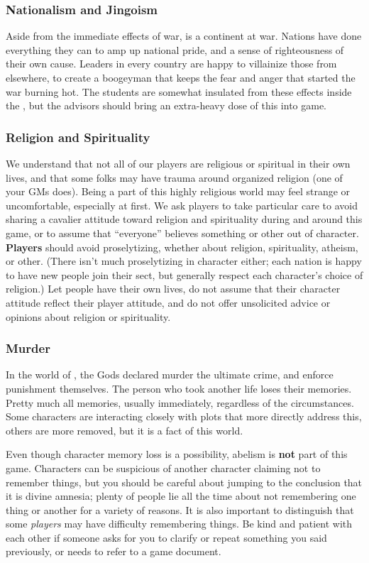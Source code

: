 \documentclass[sheet]{GL2020}
\begin{document}
\subsubsection{Nationalism and Jingoism}
Aside from the immediate effects of war, \pEarth{} is a continent at war. Nations have done everything they can to amp up national pride, and a sense of righteousness of their own cause. Leaders in every country are happy to villainize those from elsewhere, to create a boogeyman that keeps the fear and anger that started the war burning hot. The students are somewhat insulated from these effects inside the \pSchool{}, but the advisors should bring an extra-heavy dose of this into game.

\subsubsection{Religion and Spirituality}
We understand that not all of our players are religious or spiritual in their own lives, and that some folks may have trauma around organized religion (one of your GMs does). Being a part of this highly religious world may feel strange or uncomfortable, especially at first. We ask players to take particular care to avoid sharing a cavalier attitude toward religion and spirituality during and around this game, or to assume that ``everyone'' believes something or other out of character. \textbf{Players} should avoid proselytizing, whether about religion, spirituality, atheism, or other. (There isn't much proselytizing in character either; each nation is happy to have new people join their sect, but generally respect each character's choice of religion.) Let people have their own lives, do not assume that their character attitude reflect their player attitude, and do not offer unsolicited advice or opinions about religion or spirituality.

\subsubsection{Murder}
In the world of \pEarth{}, the Gods declared murder the ultimate crime, and enforce punishment themselves. The person who took another life loses their memories. Pretty much all memories, usually immediately, regardless of the circumstances. Some characters are interacting closely with plots that more directly address this, others are more removed, but it is a fact of this world. 

Even though character memory loss is a possibility, abelism is \textbf{not} part of this game. Characters can be suspicious of another character claiming not to remember things, but you should be careful about jumping to the conclusion that it is divine amnesia; plenty of people lie all the time about not remembering one thing or another for a variety of reasons. It is also important to distinguish that some \emph{players} may have difficulty remembering things. Be kind and patient with each other if someone asks for you to clarify or repeat something you said previously, or needs to refer to a game document.
\end{document}
